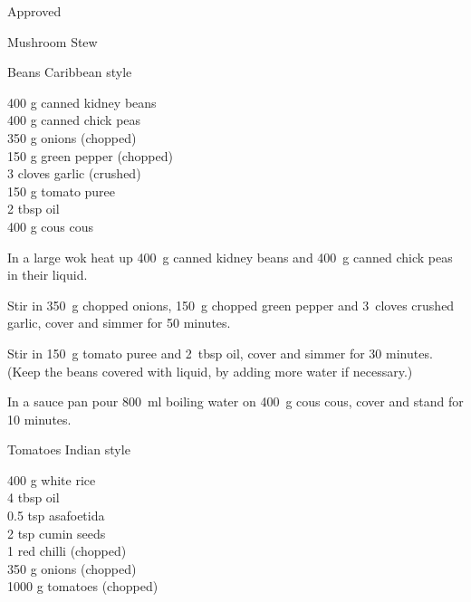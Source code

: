 \begin{menu}{Approved}
\begin{recipe}{2}{Mushroom Stew}
\begin{instructions}
    \end{instructions}
    \end{recipe}%
  
    \begin{recipe}{2}{Beans Caribbean style}%
    
		\begin{ingredients}
		400 g canned kidney beans  \\
	400 g canned chick peas  \\
	350 g onions (chopped) \\
	150 g green pepper (chopped) \\
	3 cloves garlic (crushed) \\
	150 g tomato puree  \\
	2 tbsp oil  \\
	400 g cous cous  \\
	
		\end{ingredients}
	
	
    \begin{instructions}
    \item 
        In a large wok heat up
        400~g  canned kidney beans
        and
        400~g  canned chick peas
        in their liquid.
      \item 
        Stir in
        350~g chopped onions,
        150~g chopped green pepper
        and
        3~cloves crushed garlic,
        cover and simmer for 50 minutes.
      \item 
        Stir in
        150~g  tomato puree
        and
        2~tbsp  oil,
        cover and simmer for 30 minutes.
        (Keep the beans covered with liquid,
        by adding more water if necessary.)
      \item 
      In a
      sauce pan pour 800~ml  boiling water
      on 400~g  cous cous, cover and
      stand for 10 minutes.
    
    \end{instructions}
    \end{recipe}%
  
    \begin{recipe}{2}{Tomatoes Indian style}%
    
		\begin{ingredients}
		400 g white rice  \\
	4 tbsp oil  \\
	0.5 tsp asafoetida  \\
	2 tsp cumin seeds  \\
	1  red chilli (chopped) \\
	350 g onions (chopped) \\
	1000 g tomatoes (chopped) \\
	

\end{ingredients}
\end{recipe}
\end{menu}
